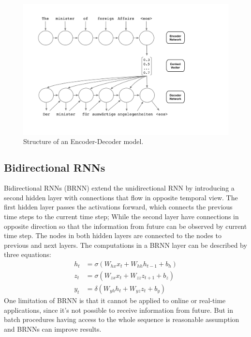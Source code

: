 \documentclass{sfuthesis}
\begin{document}
\begin{figure}[t]
\includegraphics[scale=0.15]{./images/EncDec0}
\caption{Structure of an Encoder-Decoder model.}
\label{fig:EncDec0}
\end{figure}

\subsection{Bidirectional RNNs}
Bidirectional RNNs (BRNN) \cite{Schuster:1997:BRNN} extend the unidirectional RNN by introducing a second hidden layer with connections that flow in opposite temporal view. The first hidden layer passes the activations forward, which connects the previous time steps to the current time step; While the second layer have connections in opposite direction so that the information from future can be observed by current time step. The nodes in both hidden layers are connected to the nodes to previous and next layers. The computations in a BRNN layer can be described by three equations:
\begin{align*}
    h_t &= \sigma (W_{hx} x_t + W_{hh} h_{t-1} + b_h)\\
    z_t &= \sigma (W_{zx} x_t + W_{zz} z_{t+1} + b_z)\\
    y_t &= \delta (W_{yh} h_t + W_{yz} z_t + b_y)
\end{align*}
One limitation of BRNN is that it cannot be applied to online or real-time applications, since it's not possible to receive information from future. But in batch procedures having access to the whole sequence is reasonable assumption and BRNNs can improve results.
\end{document}
